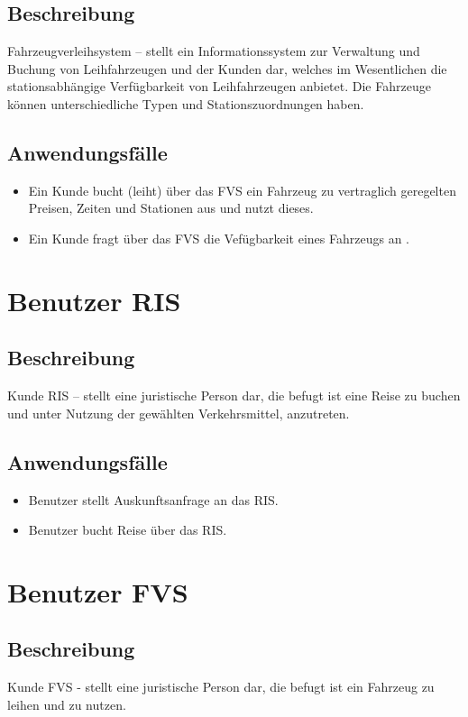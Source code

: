 \subsection{Beschreibung}
Fahrzeugverleihsystem – stellt ein Informationssystem zur Verwaltung und Buchung von Leihfahrzeugen und der Kunden dar, welches im Wesentlichen die stationsabhängige Verfügbarkeit von Leihfahrzeugen anbietet. Die Fahrzeuge können unterschiedliche Typen und Stationszuordnungen haben.

\subsection{Anwendungsfälle}
\begin{itemize}
\item Ein Kunde bucht (leiht) über das FVS ein Fahrzeug zu vertraglich geregelten Preisen, Zeiten und Stationen aus  und nutzt  dieses.
\item Ein Kunde fragt über das FVS die Vefügbarkeit eines Fahrzeugs an . 
\end{itemize}

\section{Benutzer RIS}

\subsection{Beschreibung}
Kunde RIS – stellt eine juristische Person dar, die befugt ist eine Reise zu buchen und unter Nutzung der gewählten Verkehrsmittel, anzutreten. 

\subsection{Anwendungsfälle}
\begin{itemize}
\item Benutzer stellt Auskunftsanfrage an das RIS.
\item Benutzer bucht Reise über das RIS.
\end{itemize}

\section{Benutzer FVS}

\subsection{Beschreibung}
Kunde FVS  - stellt eine juristische Person dar, die befugt ist ein Fahrzeug zu leihen und zu nutzen.

